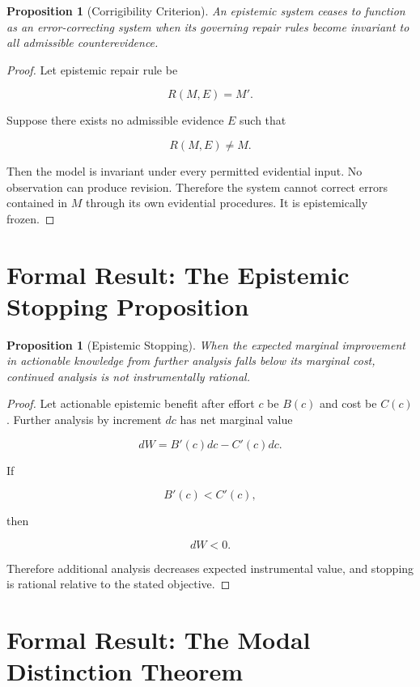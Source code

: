 \documentclass[11pt,oneside]{book}
\newtheorem{proposition}[theorem]{Proposition}
\theoremstyle{definition}
\theoremstyle{remark}
\begin{document}
\begin{proposition}[Corrigibility Criterion]
An epistemic system ceases to function as an error-correcting system when its governing repair rules become invariant to all admissible counterevidence.
\end{proposition}

\begin{proof}
Let epistemic repair rule be

\[
R(M,E)=M'.
\]

Suppose there exists no admissible evidence \(E\) such that

\[
R(M,E)\neq M.
\]

Then the model is invariant under every permitted evidential input. No observation can produce revision. Therefore the system cannot correct errors contained in \(M\) through its own evidential procedures. It is epistemically frozen.
\end{proof}

\section{Formal Result: The Epistemic Stopping Proposition}

\begin{proposition}[Epistemic Stopping]
When the expected marginal improvement in actionable knowledge from further analysis falls below its marginal cost, continued analysis is not instrumentally rational.
\end{proposition}

\begin{proof}
Let actionable epistemic benefit after effort \(c\) be \(B(c)\) and cost be \(C(c)\). Further analysis by increment \(dc\) has net marginal value

\[
dW
=
B'(c)dc-C'(c)dc.
\]

If

\[
B'(c)<C'(c),
\]

then

\[
dW<0.
\]

Therefore additional analysis decreases expected instrumental value, and stopping is rational relative to the stated objective.
\end{proof}

\section{Formal Result: The Modal Distinction Theorem}
\end{document}
